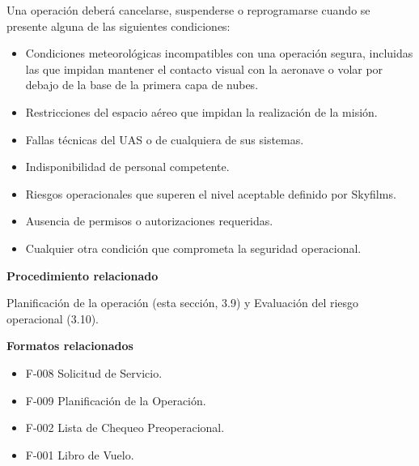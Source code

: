 Una operación deberá cancelarse, suspenderse o reprogramarse cuando se presente alguna de las siguientes condiciones:

\begin{itemize}

\item Condiciones meteorológicas incompatibles con una operación segura, incluidas las que impidan mantener el contacto visual con la aeronave o volar por debajo de la base de la primera capa de nubes.

\item Restricciones del espacio aéreo que impidan la realización de la misión.

\item Fallas técnicas del UAS o de cualquiera de sus sistemas.

\item Indisponibilidad de personal competente.

\item Riesgos operacionales que superen el nivel aceptable definido por Skyfilms.

\item Ausencia de permisos o autorizaciones requeridas.

\item Cualquier otra condición que comprometa la seguridad operacional.

\end{itemize}

\begin{tcolorbox}[title=Documentos asociados,colback=gray!5,colframe=black]

\textbf{Procedimiento relacionado}

Planificación de la operación (esta sección, 3.9) y Evaluación del riesgo operacional (3.10).

\vspace{0.2cm}

\textbf{Formatos relacionados}

\begin{itemize}
\item F-008 Solicitud de Servicio.
\item F-009 Planificación de la Operación.
\item F-002 Lista de Chequeo Preoperacional.
\item F-001 Libro de Vuelo.
\end{itemize}

\end{tcolorbox}





